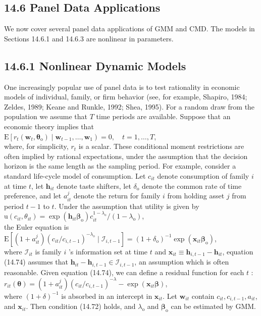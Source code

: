 \documentclass[10pt]{article}
\begin{document}
\subsection*{14.6 Panel Data Applications}
We now cover several panel data applications of GMM and CMD. The models in Sections 14.6.1 and 14.6.3 are nonlinear in parameters.

\subsection*{14.6.1 Nonlinear Dynamic Models}
One increasingly popular use of panel data is to test rationality in economic models of individual, family, or firm behavior (see, for example, Shapiro, 1984; Zeldes, 1989; Keane and Runkle, 1992; Shea, 1995). For a random draw from the population we assume that $T$ time periods are available. Suppose that an economic theory implies that\\
$\mathrm{E}\left[r_{t}\left(\mathbf{w}_{t}, \boldsymbol{\theta}_{\mathrm{o}}\right) \mid \mathbf{w}_{t-1}, \ldots, \mathbf{w}_{1}\right)=0, \quad t=1, \ldots, T$,\\
where, for simplicity, $r_{t}$ is a scalar. These conditional moment restrictions are often implied by rational expectations, under the assumption that the decision horizon is the same length as the sampling period. For example, consider a standard life-cycle model of consumption. Let $c_{i t}$ denote consumption of family $i$ at time $t$, let $\mathbf{h}_{i t}$ denote taste shifters, let $\delta_{\mathrm{o}}$ denote the common rate of time preference, and let $a_{i t}^{j}$ denote the return for family $i$ from holding asset $j$ from period $t-1$ to $t$. Under the assumption that utility is given by\\
$\mathrm{u}\left(c_{i t}, \theta_{i t}\right)=\exp \left(\mathbf{h}_{i t} \boldsymbol{\beta}_{\mathrm{o}}\right) c_{i t}^{1-\lambda_{\mathrm{o}}} /\left(1-\lambda_{\mathrm{o}}\right)$,\\
the Euler equation is\\
$\mathrm{E}\left[\left(1+a_{i t}^{j}\right)\left(c_{i t} / c_{i, t-1}\right)^{-\lambda_{\mathrm{o}}} \mid \mathscr{I}_{i, t-1}\right]=\left(1+\delta_{\mathrm{o}}\right)^{-1} \exp \left(\mathbf{x}_{i t} \boldsymbol{\beta}_{\mathrm{o}}\right)$,\\
where $\mathscr{I}_{i t}$ is family $i$ 's information set at time $t$ and $\mathbf{x}_{i t} \equiv \mathbf{h}_{i, t-1}-\mathbf{h}_{i t}$, equation (14.74) assumes that $\mathbf{h}_{i t}-\mathbf{h}_{i, t-1} \in \mathscr{I}_{i, t-1}$, an assumption which is often reasonable. Given equation (14.74), we can define a residual function for each $t$ :\\
$r_{i t}(\boldsymbol{\theta})=\left(1+a_{i t}^{j}\right)\left(c_{i t} / c_{i, t-1}\right)^{-\lambda}-\exp \left(\mathbf{x}_{i t} \boldsymbol{\beta}\right)$,\\
where $(1+\delta)^{-1}$ is absorbed in an intercept in $\mathbf{x}_{i t}$. Let $\mathbf{w}_{i t}$ contain $c_{i t}, c_{i, t-1}, a_{i t}$, and $\mathbf{x}_{i t}$. Then condition (14.72) holds, and $\lambda_{\mathrm{o}}$ and $\boldsymbol{\beta}_{\mathrm{o}}$ can be estimated by GMM.
\end{document}
